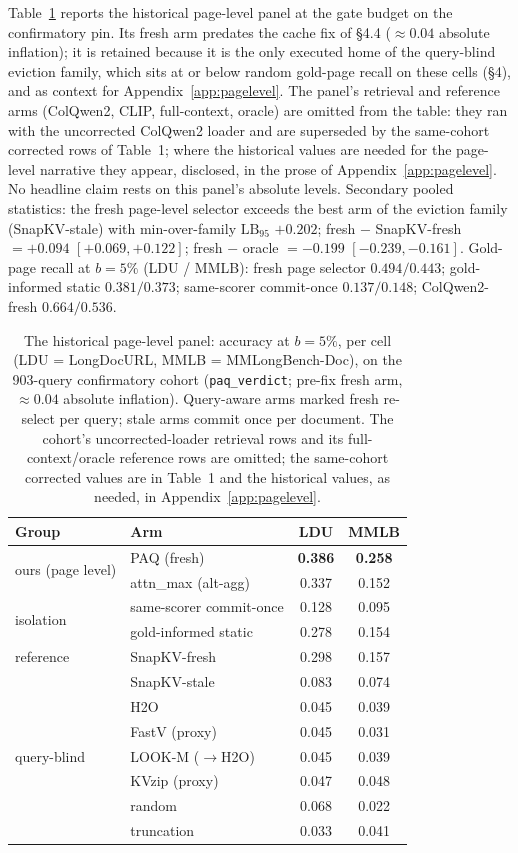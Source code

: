 \documentclass[letterpaper]{article} %
\newcommand{\paq}{\textsc{PAQ}}
\newcommand{\lb}{\mathrm{LB}_{95}}
\begin{document}
Table~\ref{tab:panel} reports the historical page-level panel at the gate
budget on the confirmatory pin. Its fresh arm predates the cache fix of
\S4.4 (${\approx}0.04$ absolute inflation); it is retained
because it is the only executed home of the query-blind eviction family,
which sits at or below random gold-page recall on these cells
(\S4), and as context for Appendix~\ref{app:pagelevel}. The
panel's retrieval and reference arms (ColQwen2, CLIP, full-context, oracle)
are omitted from the table: they ran with the uncorrected ColQwen2 loader
and are superseded by the same-cohort corrected rows of
Table~1; where the historical values are needed for the
page-level narrative they appear, disclosed, in the prose of
Appendix~\ref{app:pagelevel}. No headline claim rests on this panel's
absolute levels. Secondary pooled statistics: the fresh page-level selector
exceeds the best arm of the eviction family (SnapKV-stale) with
min-over-family $\lb$ $+0.202$; fresh $-$ SnapKV-fresh $=
+0.094$ $[+0.069,+0.122]$; fresh $-$ oracle $= -0.199$ $[-0.239,-0.161]$.
Gold-page recall at $b{=}5\%$ (LDU / MMLB): fresh page
selector $0.494/0.443$; gold-informed static $0.381/0.373$; same-scorer
commit-once $0.137/0.148$; ColQwen2-fresh $0.664/0.536$.

\begin{table}[t]
\centering\small
\setlength{\tabcolsep}{3.5pt}%
\begin{tabular}{llcc}
\toprule
Group & Arm & LDU & MMLB \\
\midrule
\multirow{2}{*}{ours (page level)}
 & \paq{} (fresh) & \textbf{0.386} & \textbf{0.258} \\
 & attn\_max (alt-agg) & 0.337 & 0.152 \\
\midrule
\multirow{2}{*}{isolation}
 & same-scorer commit-once & 0.128 & 0.095 \\
 & gold-informed static & 0.278 & 0.154 \\
\midrule
reference & SnapKV-fresh & 0.298 & 0.157 \\
\midrule
\multirow{7}{*}{query-blind}
 & SnapKV-stale & 0.083 & 0.074 \\
 & H2O & 0.045 & 0.039 \\
 & FastV (proxy) & 0.045 & 0.031 \\
 & LOOK-M ($\to$H2O) & 0.045 & 0.039 \\
 & KVzip (proxy) & 0.047 & 0.048 \\
 & random & 0.068 & 0.022 \\
 & truncation & 0.033 & 0.041 \\
\bottomrule
\end{tabular}
\caption{The historical page-level panel: accuracy at $b{=}5\%$, per cell
(LDU = LongDocURL, MMLB = MMLongBench-Doc), on the 903-query confirmatory
cohort (\texttt{paq\_verdict}; pre-fix fresh arm, ${\approx}0.04$ absolute
inflation). Query-aware arms marked fresh re-select per query; stale arms
commit once per document. The cohort's uncorrected-loader retrieval rows and
its full-context/oracle reference rows are omitted; the same-cohort
corrected values are in Table~1 and the historical values, as
needed, in Appendix~\ref{app:pagelevel}.}
\label{tab:panel}
\end{table}
\end{document}
